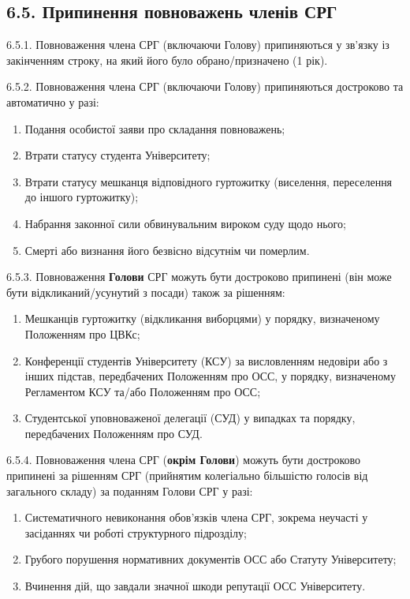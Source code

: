 \subsection*{6.5. Припинення повноважень членів СРГ}
    6.5.1. Повноваження члена СРГ (включаючи Голову) припиняються у зв'язку із закінченням строку, на який його було обрано/призначено (1 рік).

    6.5.2. Повноваження члена СРГ (включаючи Голову) припиняються достроково та автоматично у разі:

        \begin{enumerate}[label=\alph*)]
            \item Подання особистої заяви про складання повноважень;
            \item Втрати статусу студента Університету;
            \item Втрати статусу мешканця відповідного гуртожитку (виселення, переселення до іншого гуртожитку);
            \item Набрання законної сили обвинувальним вироком суду щодо нього;
            \item Смерті або визнання його безвісно відсутнім чи померлим.
        \end{enumerate}

    6.5.3. Повноваження \textbf{Голови} СРГ можуть бути достроково припинені (він може бути відкликаний/усунутий з посади) також за рішенням:

        \begin{enumerate}[label=\alph*)]
            \item Мешканців гуртожитку (відкликання виборцями) у порядку, визначеному Положенням про ЦВКс;
            \item Конференції студентів Університету (КСУ) за висловленням недовіри або з інших підстав, передбачених Положенням про ОСС, у порядку, визначеному Регламентом КСУ та/або Положенням про ОСС;
            \item Студентської уповноваженої делегації (СУД) у випадках та порядку, передбачених Положенням про СУД.
        \end{enumerate}

    6.5.4. Повноваження члена СРГ (\textbf{окрім Голови}) можуть бути достроково припинені за рішенням СРГ (прийнятим колегіально більшістю голосів від загального складу) за поданням Голови СРГ у разі:

        \begin{enumerate}[label=\alph*)]
            \item Систематичного невиконання обов'язків члена СРГ, зокрема неучасті у засіданнях чи роботі структурного підрозділу;
            \item Грубого порушення нормативних документів ОСС або Статуту Університету;
            \item Вчинення дій, що завдали значної шкоди репутації ОСС Університету.
        \end{enumerate}

